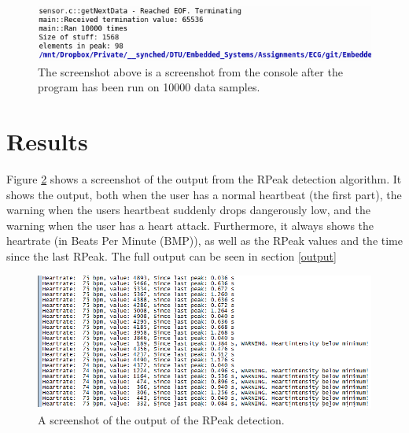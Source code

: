\documentclass[12pt,a4paper]{article}
\begin{document}
	\begin{figure}[h!]
			\centering
				\includegraphics[width=1\textwidth]{Screenshots/size_results.png}
			\caption{The screenshot above is a screenshot from the console after the program has been run on 10000 data samples.}
			\label{size_result}
		\end{figure}
	
\section{Results}
	Figure \ref{RPeakDetection_result} shows a screenshot of the output from the RPeak detection algorithm. It shows the output, both when the user has a normal heartbeat (the first part), the warning when the users heartbeat suddenly drops dangerously low, and the warning when the user has a heart attack. Furthermore, it always shows the heartrate (in Beats Per Minute (BMP)), as well as the RPeak values and the time since the last RPeak. The full output can be seen in section \ref{output}
	
	
	\begin{figure}[h!]
		\centering
			\includegraphics[width=1\textwidth]{Screenshots/RPeakDetection_result.png}
		\caption{A screenshot of the output of the RPeak detection.}
		\label{RPeakDetection_result}
	\end{figure}
\end{document}
